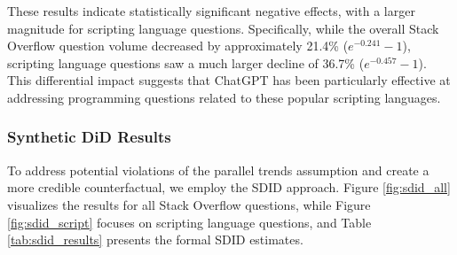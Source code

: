 These results indicate statistically significant negative effects, with a larger magnitude for scripting language questions. Specifically, while the overall Stack Overflow question volume decreased by approximately 21.4\% ($e^{-0.241}-1$), scripting language questions saw a much larger decline of 36.7\% ($e^{-0.457}-1$). This differential impact suggests that ChatGPT has been particularly effective at addressing programming questions related to these popular scripting languages.


\subsubsection{Synthetic DiD Results}
To address potential violations of the parallel trends assumption and create a more credible counterfactual, we employ the SDID approach. Figure \ref{fig:sdid_all} visualizes the results for all Stack Overflow questions, while Figure \ref{fig:sdid_script} focuses on scripting language questions, and Table \ref{tab:sdid_results} presents the formal SDID estimates.

